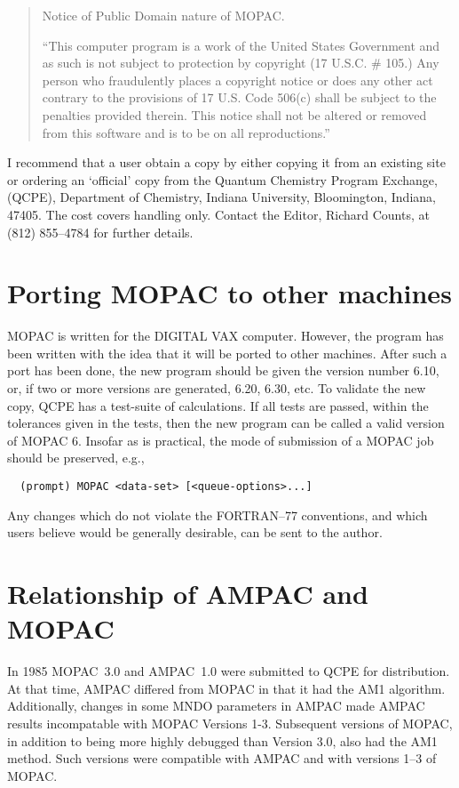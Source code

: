 \documentclass[a4paper]{book}
\newcommand{\mi}[1]{#1\index{#1}}
\begin{document}
\begin{quote}
          Notice of Public Domain nature of MOPAC.

         ``This computer program is a work of the United States 
          Government and as such is not subject to protection by 
          copyright (17 U.S.C. \# 105.)  Any person who fraudulently 
          places a copyright notice or does any other act contrary 
          to the provisions of 17 U.S. Code 506(c) shall be subject 
          to the penalties provided therein.  This notice shall not 
          be altered or removed from this software and is to be on 
          all reproductions.''
\end{quote}

   I recommend that a user obtain a  copy  by  either  copying  it  from  an
   existing  site  or ordering an `official' copy from the Quantum Chemistry
   Program Exchange, (QCPE), Department of  Chemistry,  Indiana  University,
   Bloomington, Indiana, 47405.  The cost 
   covers handling only.  Contact the
   Editor, Richard Counts, at (812) 855--4784 for further details.
         
\section{Porting MOPAC to other machines}
 MOPAC is written for the DIGITAL \mi{VAX} computer.  However, the program
 has  been written with the idea that it will be ported to other machines.
 After such a port has been done, the new  program  should  be  given  the
 version  number  6.10,  or,  if two or more versions are generated, 6.20,
 6.30,  etc.   To  validate  the  new  copy,  QCPE  has  a  test-suite  of
 calculations.   If  all  tests are passed, within the tolerances given in
 the tests, then the new program can be called a valid version of MOPAC 6.
 Insofar  as is practical, the mode of submission of a MOPAC job should be
 preserved, e.g.,
\begin{verbatim}   
  (prompt) MOPAC <data-set> [<queue-options>...]
\end{verbatim}
 
      Any changes which do not violate  the FORTRAN--77  conventions,  and
 which  users  believe  would  be  generally desirable, can be sent to the
 author.

\section{Relationship of AMPAC and MOPAC}
   In 1985  MOPAC~3.0  and  AMPAC~1.0  were  submitted  to  QCPE  for
   distribution.  At that time, AMPAC differed from MOPAC in that it had the
   AM1 algorithm.  Additionally, changes in some MNDO  parameters  in  AMPAC
   made  AMPAC  results  incompatable  with  MOPAC Versions 1-3.  Subsequent
   versions of MOPAC, in addition to being more highly debugged than Version
   3.0,  also  had the AM1 method.  Such versions were compatible with AMPAC
   and with versions 1--3 of MOPAC.
\end{document}
